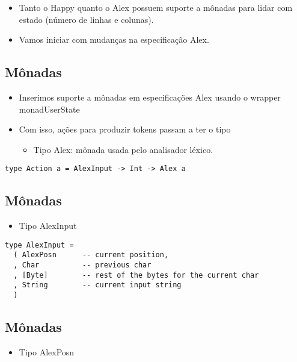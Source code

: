 \documentclass[11pt]{article}
\begin{document}
\begin{itemize}
\item Tanto o Happy quanto o Alex possuem suporte a mônadas para lidar com estado (número de linhas e colunas).

\item Vamos iniciar com mudanças na especificação Alex.
\end{itemize}
\subsection*{Mônadas}
\label{sec:org2bf99a6}

\begin{itemize}
\item Inserimos suporte a mônadas em especificações Alex usando o wrapper monadUserState

\item Com isso, ações para produzir tokens passam a ter o tipo
\begin{itemize}
\item Tipo Alex: mônada usada pelo analisador léxico.
\end{itemize}
\end{itemize}

\begin{verbatim}
type Action a = AlexInput -> Int -> Alex a
\end{verbatim}
\subsection*{Mônadas}
\label{sec:org5153a9b}

\begin{itemize}
\item Tipo AlexInput
\end{itemize}

\begin{verbatim}
type AlexInput =
  ( AlexPosn      -- current position,
  , Char          -- previous char
  , [Byte]        -- rest of the bytes for the current char
  , String        -- current input string
  )
\end{verbatim}
\subsection*{Mônadas}
\label{sec:org5ddc3a2}

\begin{itemize}
\item Tipo AlexPosn
\end{itemize}
\end{document}
